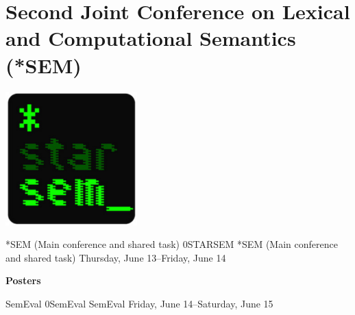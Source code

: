 \chapter[*SEM and SemEval: Thursday--Saturday, June 13--15]{Second Joint Conference on Lexical and Computational Semantics (*SEM)}
\thispagestyle{emptyheader}
\vfill
\begin{center}
  \includegraphics[width=2in]{content/starsem/starsem}
\end{center}
\vfill

\cleardoublepage

\clearpage


\clearpage
\begin{wsschedule}
{*SEM (Main conference and shared task)}
{0}{STARSEM}
{*SEM (Main conference and shared task)}
{Thursday, June 13--Friday, June 14}{\SSemLoc}

\end{wsschedule}

\clearpage



\clearpage
\par\centerline{\bfseries\large Posters}\vspace{1em}\par


\clearpage
\begin{wsschedule}
{SemEval}
{0}{SemEval}
{SemEval}
{Friday, June 14--Saturday, June 15}{\SemEvalLoc}

\end{wsschedule}
